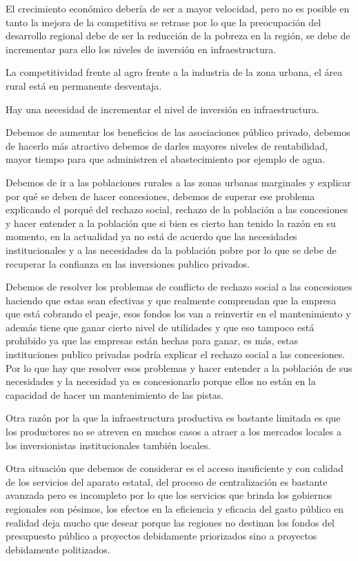 \documentclass[
  letterpaper,
  DIV=11,
  numbers=noendperiod]{scrartcl}
\begin{document}
El crecimiento económico debería de ser a mayor velocidad, pero no es
posible en tanto la mejora de la competitiva se retrase por lo que la
preocupación del desarrollo regional debe de ser la reducción de la
pobreza en la región, se debe de incrementar para ello los niveles de
inversión en infraestructura.

La competitividad frente al agro frente a la industria de la zona
urbana, el área rural está en permanente desventaja.

Hay una necesidad de incrementar el nivel de inversión en
infraestructura.

Debemos de aumentar los beneficios de las asociaciones público privado,
debemos de hacerlo más atractivo debemos de darles mayores niveles de
rentabilidad, mayor tiempo para que administren el abastecimiento por
ejemplo de agua.

Debemos de ir a las poblaciones rurales a las zonas urbanas marginales y
explicar por qué se deben de hacer concesiones, debemos de superar ese
problema explicando el porqué del rechazo social, rechazo de la
población a las concesiones y hacer entender a la población que si bien
es cierto han tenido la razón en su momento, en la actualidad ya no está
de acuerdo que las necesidades institucionales y a las necesidades da la
población pobre por lo que se debe de recuperar la confianza en las
inversiones publico privados.

Debemos de resolver los problemas de conflicto de rechazo social a las
concesiones haciendo que estas sean efectivas y que realmente comprendan
que la empresa que está cobrando el peaje, esos fondos los van a
reinvertir en el mantenimiento y además tiene que ganar cierto nivel de
utilidades y que eso tampoco está prohibido ya que las empresas están
hechas para ganar, es más, estas instituciones publico privadas podría
explicar el rechazo social a las concesiones. Por lo que hay que
resolver esos problemas y hacer entender a la población de sus
necesidades y la necesidad ya es concesionarlo porque ellos no están en
la capacidad de hacer un mantenimiento de las pistas.

Otra razón por la que la infraestructura productiva es bastante limitada
es que los productores no se atreven en muchos casos a atraer a los
mercados locales a los inversionistas institucionales también locales.

Otra situación que debemos de considerar es el acceso insuficiente y con
calidad de los servicios del aparato estatal, del proceso de
centralización es bastante avanzada pero es incompleto por lo que los
servicios que brinda los gobiernos regionales son pésimos, los efectos
en la eficiencia y eficacia del gasto público en realidad deja mucho que
desear porque las regiones no destinan los fondos del presupuesto
público a proyectos debidamente priorizados sino a proyectos debidamente
politizados.
\end{document}
